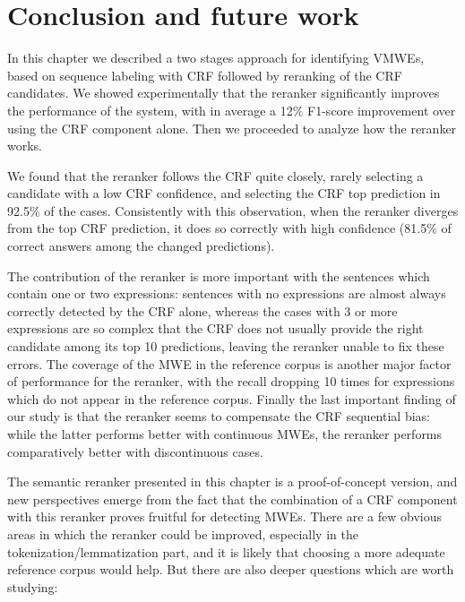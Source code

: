 \documentclass[output=paper
,modfonts
,nonflat]{langsci/langscibook}
\begin{document}
\section{\label{moreau:sec:conc2}Conclusion and future work}


In this chapter we described a two stages approach for identifying
VMWEs, based on sequence labeling with CRF followed by reranking of
the CRF candidates. We showed experimentally that the reranker
significantly improves the performance of the system, with in average
a 12\% F1-score improvement over using the CRF component alone. Then
we proceeded to analyze how the reranker works.

We found that the reranker follows the CRF quite closely, rarely
selecting a candidate with a low CRF confidence, and selecting the CRF
top prediction in 92.5\% of the cases. Consistently with this
observation, when the reranker diverges from the top CRF prediction,
it does so correctly with high confidence (81.5\% of correct answers
among the changed predictions).

The contribution of the reranker is more important with the sentences
which contain one or two expressions: sentences with no expressions
are almost always correctly detected by the CRF alone, whereas the
cases with 3 or more expressions are so complex that the CRF does not
usually provide the right candidate among its top 10 predictions,
leaving the reranker unable to fix these errors. The coverage of the
MWE in the reference corpus is another major factor of performance for
the reranker, with the recall dropping 10 times for expressions which
do not appear in the reference corpus. Finally the last important
finding of our study is that the reranker seems to compensate the CRF
sequential bias: while the latter performs better with continuous
MWEs, the reranker performs comparatively better with discontinuous
cases.

The semantic reranker presented in this chapter is a proof-of-concept
version, and new perspectives emerge from the fact that the
combination of a CRF component with this reranker proves fruitful for
detecting MWEs. There are a few obvious areas in which the reranker
could be improved, especially in the tokenization/lemmatization part,
and it is likely that choosing a more adequate reference corpus would
help. But there are also deeper questions which are worth studying:
\end{document}
